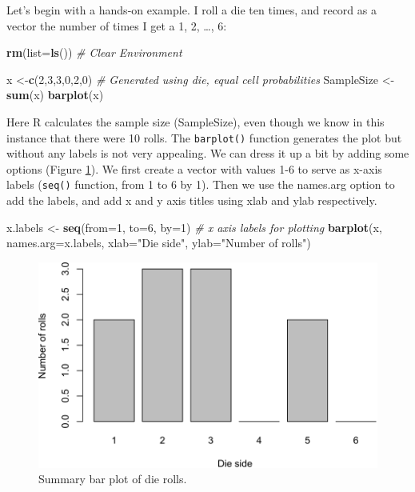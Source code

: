 \documentclass[
]{krantz}
\makeatletter
\newenvironment{Shaded}{\begin{snugshade}}{\end{snugshade}}
\newcommand{\AttributeTok}[1]{\textcolor[rgb]{0.27,0.27,0.27}{#1}}
\newcommand{\CommentTok}[1]{\textcolor[rgb]{0.37,0.37,0.37}{\textit{#1}}}
\newcommand{\DecValTok}[1]{\textcolor[rgb]{0.06,0.06,0.06}{#1}}
\newcommand{\FunctionTok}[1]{\textcolor[rgb]{0.27,0.27,0.27}{\textbf{#1}}}
\newcommand{\NormalTok}[1]{#1}
\newcommand{\OtherTok}[1]{\textcolor[rgb]{0.37,0.37,0.37}{#1}}
\newcommand{\StringTok}[1]{\textcolor[rgb]{0.5,0.5,0.5}{#1}}
\newenvironment{kframe}{%
\medskip{}
\setlength{\fboxsep}{.8em}
 \def\at@end@of@kframe{}%
 \ifinner\ifhmode%
  \def\at@end@of@kframe{\end{minipage}}%
  \begin{minipage}{\columnwidth}%
 \fi\fi%
 \def\FrameCommand##1{\hskip\@totalleftmargin \hskip-\fboxsep
 \colorbox{shadecolor}{##1}\hskip-\fboxsep
     \hskip-\linewidth \hskip-\@totalleftmargin \hskip\columnwidth}%
 \MakeFramed {\advance\hsize-\width
   \@totalleftmargin\z@ \linewidth\hsize
   \@setminipage}}%
 {\par\unskip\endMakeFramed%
 \at@end@of@kframe}
\renewenvironment{Shaded}{\begin{kframe}}{\end{kframe}}
\makeatother
\begin{document}
Let's begin with a hands-on example. I roll a die ten times, and record as a vector the number of times I get a 1, 2, \ldots, 6:

\begin{Shaded}
\begin{Highlighting}[]
\FunctionTok{rm}\NormalTok{(}\AttributeTok{list=}\FunctionTok{ls}\NormalTok{()) }\CommentTok{\# Clear Environment}

\NormalTok{x }\OtherTok{\textless{}{-}}\FunctionTok{c}\NormalTok{(}\DecValTok{2}\NormalTok{,}\DecValTok{3}\NormalTok{,}\DecValTok{3}\NormalTok{,}\DecValTok{0}\NormalTok{,}\DecValTok{2}\NormalTok{,}\DecValTok{0}\NormalTok{)  }\CommentTok{\# Generated using die, equal cell probabilities}
\NormalTok{SampleSize }\OtherTok{\textless{}{-}} \FunctionTok{sum}\NormalTok{(x)}
\FunctionTok{barplot}\NormalTok{(x)}
\end{Highlighting}
\end{Shaded}

Here R calculates the sample size (SampleSize), even though we know in this instance that there were 10 rolls. The \texttt{barplot()} function generates the plot but without any labels is not very appealing. We can dress it up a bit by adding some options (Figure \ref{fig:dieRoll}). We first create a vector with values 1-6 to serve as x-axis labels (\texttt{seq()} function, from 1 to 6 by 1). Then we use the names.arg option to add the labels, and add x and y axis titles using xlab and ylab respectively.

\begin{Shaded}
\begin{Highlighting}[]
\NormalTok{x.labels }\OtherTok{\textless{}{-}} \FunctionTok{seq}\NormalTok{(}\AttributeTok{from=}\DecValTok{1}\NormalTok{, }\AttributeTok{to=}\DecValTok{6}\NormalTok{, }\AttributeTok{by=}\DecValTok{1}\NormalTok{)  }\CommentTok{\# x axis labels for plotting}
\FunctionTok{barplot}\NormalTok{(x, }\AttributeTok{names.arg=}\NormalTok{x.labels, }\AttributeTok{xlab=}\StringTok{"Die side"}\NormalTok{, }\AttributeTok{ylab=}\StringTok{"Number of rolls"}\NormalTok{)}
\end{Highlighting}
\end{Shaded}

\begin{figure}
\includegraphics[width=0.9\linewidth]{bookdown_files/figure-latex/dieRoll-1} \caption{Summary bar plot of die rolls.}\label{fig:dieRoll}
\end{figure}
\end{document}
